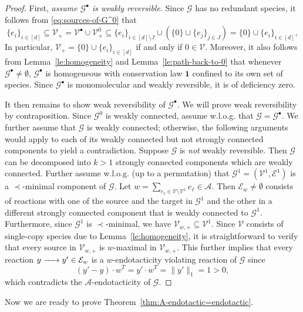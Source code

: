 \documentclass[10pt]{amsart}
\numberwithin{equation}{section}
\theoremstyle{plain}
\theoremstyle{definition}
\theoremstyle{remark}
\newcommand{\cA}{\mathcal{A}}
\newcommand{\cE}{\mathcal{E}}
\newcommand{\cG}{\mathcal{G}}
\newcommand{\cV}{\mathcal{V}}
\begin{document}
\begin{proof}
First, \emph{assume $\cG^{\bullet}$ is weakly reversible}. Since $\cG$ has no redundant species,  it follows from 
\eqref{eq:sources-of-G^0} that $$\{e_i\}_{i\in[d]}\subseteq\cV_+ = \cV^{\bullet}\cup\cV^0_+ \subseteq\{e_i\}_{i\in[d]\setminus J}\cup(\{0\}\cup\{e_j\}_{j\in J})=\{0\}\cup\{e_i\}_{i\in[d]},$$ 
In particular, $\mathcal{V}_+=\{0\}\cup\{e_i\}_{i\in[d]}$ if and only if 
$0\in\cV$. Moreover, it also follows from  Lemma~\ref{le:homogeneity} and Lemma~\ref{le:path-back-to-0} that whenever $\cG^{\bullet}\neq\emptyset$, $\cG^{\bullet}$ is homogeneous with conservation law $\mathbf{1}$ confined to its own set of species. Since $\cG^{\bullet}$ is monomolecular and weakly reversible, it is of deficiency zero. 


It then remains to show weak reversibility of $\cG^{\bullet}$. We  will prove weak reversibility by contraposition. Since $\cG^0$ is weakly connected, assume w.l.o.g. that $\cG=\cG^{\bullet}$.  We further assume that $\cG$ is weakly connected; otherwise, the following arguments would apply to each of its weakly connected but not strongly connected components to yield a contradiction.
 Suppose $\cG$ is \emph{not} weakly reversible. Then $\cG$ can be decomposed into $k>1$ strongly connected components which are weakly connected.  Further assume w.l.o.g. (up to a permutation) that $\cG^1=(\cV^1,\cE^1)$ is a $\prec$-minimal component of $\cG$. Let $w=\sum_{e_{\ell}\in\cV\setminus\cV^1}e_{\ell}\in\cA$. Then  $\cE_w\neq\emptyset$ consists of reactions with one of the source and the target in $\cG^1$ and the other in a different strongly connected component that is weakly connected to $\cG^1$.  Furthermore, since $\cG^1$ is $\prec$-minimal, we have $\cV_{w,+}\subseteq\cV^1$.  Since $\cV$ consists of single-copy species due to Lemma~\ref{le:homogeneity}, it is straightforward to verify that every source in $\cV_{w,+}$ is $w$-maximal in $\cV_{w,+}$. This further implies that every reaction $y\ce{->}y'\in\cE_w$ is a  $w$-endotacticity violating reaction of $\cG$ since $$(y'-y)\cdot w^T=y'\cdot w^T=\|y'\|_1=1>0,$$
which contradicts  the $\cA$-endotacticity of $\cG$.
\end{proof}


Now we are ready to prove Theorem~\ref{thm:A-endotactic=endotactic}.
\end{document}
